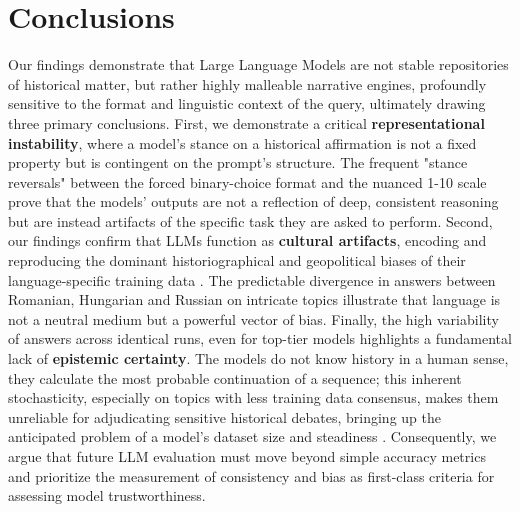 \documentclass[11pt]{article}
\begin{document}
\FloatBarrier

\section{Conclusions}
Our findings demonstrate that Large Language Models are not stable repositories of historical matter, but rather highly malleable narrative engines, profoundly sensitive to the format and linguistic context of the query, ultimately drawing three primary conclusions. First, we demonstrate a critical \textbf{representational instability}, where a model's stance on a historical affirmation is not a fixed property but is contingent on the prompt's structure. The frequent "stance reversals" between the forced binary-choice format and the nuanced 1-10 scale prove that the models' outputs are not a reflection of deep, consistent reasoning but are instead artifacts of the specific task they are asked to perform. Second, our findings confirm that LLMs function as \textbf{cultural artifacts}, encoding and reproducing the dominant historiographical and geopolitical biases of their language-specific training data \cite{gururangan2022}. The predictable divergence in answers between Romanian, Hungarian and Russian on intricate topics illustrate that language is not a neutral medium but a powerful vector of bias. Finally, the high variability of answers across identical runs, even for top-tier models highlights a fundamental lack of \textbf{epistemic certainty}. The models do not know history in a human sense, they calculate the most probable continuation of a sequence; this inherent stochasticity, especially on topics with less training data consensus, makes them unreliable for adjudicating sensitive historical debates, bringing up the anticipated problem of a model's dataset size and steadiness \cite{bender2021}. Consequently, we argue that future LLM evaluation must move beyond simple accuracy metrics and prioritize the measurement of consistency and bias as first-class criteria for assessing model trustworthiness.
\end{document}
